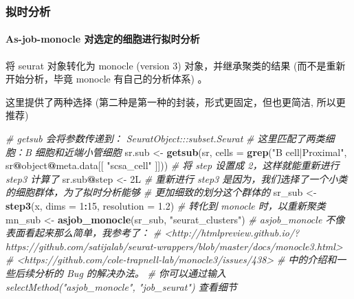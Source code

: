 \documentclass[
]{article}
\newenvironment{Shaded}{\begin{snugshade}}{\end{snugshade}}
\newcommand{\CommentTok}[1]{\textcolor[rgb]{0.56,0.35,0.01}{\textit{#1}}}
\newcommand{\DataTypeTok}[1]{\textcolor[rgb]{0.13,0.29,0.53}{#1}}
\newcommand{\DecValTok}[1]{\textcolor[rgb]{0.00,0.00,0.81}{#1}}
\newcommand{\FloatTok}[1]{\textcolor[rgb]{0.00,0.00,0.81}{#1}}
\newcommand{\KeywordTok}[1]{\textcolor[rgb]{0.13,0.29,0.53}{\textbf{#1}}}
\newcommand{\NormalTok}[1]{#1}
\newcommand{\OperatorTok}[1]{\textcolor[rgb]{0.81,0.36,0.00}{\textbf{#1}}}
\newcommand{\StringTok}[1]{\textcolor[rgb]{0.31,0.60,0.02}{#1}}
\begin{document}
\hypertarget{ux62dfux65f6ux5206ux6790}{%
\subsubsection{拟时分析}\label{ux62dfux65f6ux5206ux6790}}

\hypertarget{as-job-monocle-ux5bf9ux9009ux5b9aux7684ux7ec6ux80deux8fdbux884cux62dfux65f6ux5206ux6790}{%
\paragraph{As-job-monocle 对选定的细胞进行拟时分析}\label{as-job-monocle-ux5bf9ux9009ux5b9aux7684ux7ec6ux80deux8fdbux884cux62dfux65f6ux5206ux6790}}

将 seurat 对象转化为 monocle (version 3) 对象，并继承聚类的结果 (而不是重新开始分析，毕竟 monocle 有自己的分析体系) 。

这里提供了两种选择 (第二种是第一种的封装，形式更固定，但也更简洁, 所以更推荐)

\begin{Shaded}
\begin{Highlighting}[]
\CommentTok{\# getsub 会将参数传递到： SeuratObject:::subset.Seurat}
\CommentTok{\# 这里匹配了两类细胞：B 细胞和近端小管细胞}
\NormalTok{sr.sub \textless{}{-}}\StringTok{ }\KeywordTok{getsub}\NormalTok{(sr, }\DataTypeTok{cells =} \KeywordTok{grep}\NormalTok{(}\StringTok{"B cell|Proximal"}\NormalTok{, sr}\OperatorTok{@}\NormalTok{object}\OperatorTok{@}\NormalTok{meta.data[[ }\StringTok{"scsa\_cell"}\NormalTok{ ]]))}
\CommentTok{\# 将 step 设置成 2，这样就能重新进行 step3 计算了}
\NormalTok{sr.sub}\OperatorTok{@}\NormalTok{step \textless{}{-}}\StringTok{ }\NormalTok{2L}
\CommentTok{\# 重新进行 step3 是因为，我们选择了一个小类的细胞群体，为了拟时分析能够}
\CommentTok{\# 更加细致的划分这个群体的}
\NormalTok{sr\_sub \textless{}{-}}\StringTok{ }\KeywordTok{step3}\NormalTok{(x, }\DataTypeTok{dims =} \DecValTok{1}\OperatorTok{:}\DecValTok{15}\NormalTok{, }\DataTypeTok{resolution =} \FloatTok{1.2}\NormalTok{)}
\CommentTok{\# 转化到 monocle 时，以重新聚类}
\NormalTok{mn\_sub \textless{}{-}}\StringTok{ }\KeywordTok{asjob\_monocle}\NormalTok{(sr\_sub, }\StringTok{"seurat\_clusters"}\NormalTok{)}
\CommentTok{\# \textasciigrave{}asjob\_monocle\textasciigrave{} 不像表面看起来那么简单，我参考了：}
\CommentTok{\# \textless{}http://htmlpreview.github.io/?https://github.com/satijalab/seurat{-}wrappers/blob/master/docs/monocle3.html\textgreater{}}
\CommentTok{\# \textless{}https://github.com/cole{-}trapnell{-}lab/monocle3/issues/438\textgreater{}}
\CommentTok{\# 中的介绍和一些后续分析的 Bug 的解决办法。}
\CommentTok{\# 你可以通过输入 \textasciigrave{}selectMethod("asjob\_monocle", "job\_seurat")\textasciigrave{} 查看细节}
\end{Highlighting}
\end{Shaded}
\end{document}

